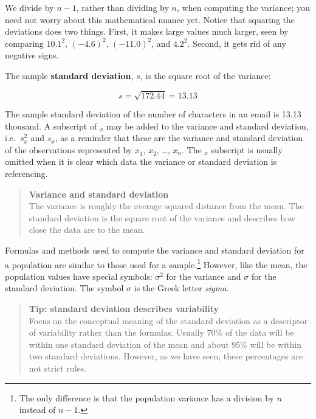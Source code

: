 \documentclass[
  letterpaper,
  DIV=11,
  numbers=noendperiod]{scrreprt}
\begin{document}
We divide by \(n - 1\), rather than dividing by \(n\), when computing
the variance; you need not worry about this mathematical nuance yet.
Notice that squaring the deviations does two things. First, it makes
large values much larger, seen by comparing \(10.1^2\), \((-4.6)^2\),
\((-11.0)^2\), and \(4.2^2\). Second, it gets rid of any negative signs.

The sample \textbf{standard deviation}, \(s\), is the square root of the
variance:

\[s = \sqrt{172.44} = 13.13\]

The sample standard deviation of the number of characters in an email is
13.13 thousand. A subscript of \(_x\) may be added to the variance and
standard deviation, i.e.~\(s_x^2\) and \(s_x^{}\), as a reminder that
these are the variance and standard deviation of the observations
represented by \(x_1^{}\), \(x_2^{}\), \ldots, \(x_n^{}\). The \(_{x}\)
subscript is usually omitted when it is clear which data the variance or
standard deviation is referencing.

\begin{quote}
\textbf{Variance and standard deviation}\\
The variance is roughly the average squared distance from the mean. The
standard deviation is the square root of the variance and describes how
close the data are to the mean.
\end{quote}

Formulas and methods used to compute the variance and standard deviation
for a population are similar to those used for a sample.\footnote{The
  only difference is that the population variance has a division by
  \(n\) instead of \(n - 1\).} However, like the mean, the population
values have special symbols: \(\sigma_{}^2\) for the variance and
\(\sigma\) for the standard deviation. The symbol \(\sigma\) is the
Greek letter \emph{sigma}.

\begin{quote}
\textbf{Tip: standard deviation describes variability}\\
Focus on the conceptual meaning of the standard deviation as a
descriptor of variability rather than the formulas. Usually 70\% of the
data will be within one standard deviation of the mean and about 95\%
will be within two standard deviations. However, as we have seen, these
percentages are not strict rules.
\end{quote}
\end{document}

